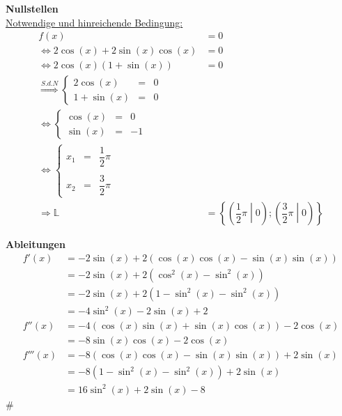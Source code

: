\documentclass[../MAIN/main.tex]{subfiles}
\begin{document}
\begin{minipage}[t]{0.5\textwidth}
  \textbf{Nullstellen}\\
  \underline{Notwendige und hinreichende Bedingung:}\\
  \begin{align*}
    f(x)                                        &=0\\
    \Leftrightarrow 2\cos(x)+2\sin(x)\cos(x)    &=0\\
    \Leftrightarrow 2\cos(x)(1+\sin(x))         &=0\\
    \stackrel{S.d.N}{\Rightarrow}
    \left\{\begin{array}{rccl}
      2\cos(x)  &=  &0  & \\
      1+\sin(x) &=  &0  &
    \end{array} \\
    \Leftrightarrow
    \left\{ \begin{array}{rccl}
      \cos(x) & = & 0 \\
      \sin(x) & = & -1
    \end{array} \\
    \Leftrightarrow
    \left\{ \begin{array}{rccl}
      x_1&=&\dfrac{1}{2}\pi&  \\\\
      x_2&=&\dfrac{3}{2}\pi&
    \end{array} \\
    \Rightarrow \mathbb{L} &= \left \{ \left( \dfrac{1}{2} \pi \middle| 0 \right) ; \left( \dfrac{3}{2} \pi \middle| 0 \right) \right\}
  \end{align*}
\end{minipage}
\vline
\begin{minipage}[t]{0.5\textwidth}
  \textbf{Ableitungen}\\
    \begin{align*}
      f'(x)&=-2\sin(x)+2(\cos(x)\cos(x)-\sin(x)\sin(x))\\
      &=-2\sin(x)+2(\cos^2(x)-\sin^2(x))\\
      &=-2\sin(x)+2(1-\sin^2(x)-\sin^2(x))\\
      &=-4\sin^2(x)-2\sin(x)+2\\
      f''(x)&=-4(\cos(x)\sin(x)+\sin(x)\cos(x))-2\cos(x)\\
      &=-8\sin(x)\cos(x)-2\cos(x)\\
      f'''(x)&=-8(\cos(x)\cos(x)-\sin(x)\sin(x))+2\sin(x)\\
      &=-8(1-\sin^2(x)-\sin^2(x))+2\sin(x)\\
      &=16\sin^2(x)+2\sin(x)-8
    \end{align*}#
\end{minipage}
\\\\
\end{document}
